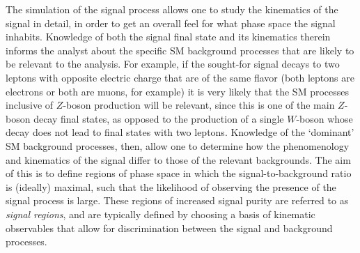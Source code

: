 The simulation of the signal process allows one to study the kinematics of the signal in detail, in order
to get an overall feel for what phase space the signal inhabits.
Knowledge of both the signal final state and its kinematics therein informs the analyst
about the specific SM background processes that are likely to be relevant to the analysis.
For example, if the sought-for signal decays to two leptons with opposite electric charge
that are of the same flavor (both leptons are electrons or both are muons, for example)
it is very likely that the SM processes inclusive of $Z$-boson production will be relevant,
since this is one of the main $Z$-boson decay final states, as opposed to the production of a single $W$-boson
whose decay does not lead to final states with two leptons.
Knowledge of the `dominant' SM background processes, then, allow
one to determine how the phenomenology and kinematics of the signal differ
to those of the relevant backgrounds.
The aim of this is to define regions of phase space in which the signal-to-background ratio
is (ideally) maximal, such that the likelihood of observing the presence of the signal process
is large.
These regions of increased signal purity are referred to as \textit{signal regions},
and are typically defined by choosing a basis of kinematic observables
that allow for discrimination between the signal and background processes.






